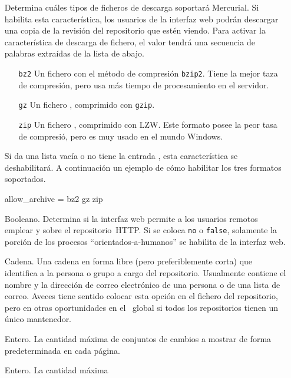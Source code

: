 \begin{itemize}
\item[\rcitem{web}{allow\_archive}] Determina cuáles tipos de ficheros
  de descarga soportará Mercurial.  Si habilita esta característica,
  los usuarios de la interfaz web podrán descargar una copia de la
  revisión del repositorio que estén viendo. Para activar la
  característica de descarga de fichero, el valor tendrá una secuencia
  de palabras extraídas de la lista de abajo.
  \begin{itemize}
  \item[\texttt{bz2}] Un fichero  con el método de
    compresión \texttt{bzip2}.  Tiene la mejor taza de compresión,
    pero usa más tiempo de procesamiento en el servidor.
  \item[\texttt{gz}] Un fichero , comprimido con
    \texttt{gzip}.
  \item[\texttt{zip}] Un fichero , comprimido con LZW.
    Este formato posee la peor tasa de compresió, pero es muy usado en
    el mundo Windows.
  \end{itemize}
  Si da una lista vacía o no tiene la entrada
  , esta característica se deshabilitará.
  A continuación un ejemplo de cómo habilitar los tres formatos soportados.
  \begin{codesample4}
    [web]
    allow_archive = bz2 gz zip
  \end{codesample4}
\item[\rcitem{web}{allowpull}] Booleano.  Determina si la interfaz web
  permite a los usuarios remotos emplear  y 
  sobre el repositorio~HTTP.  Si se coloca \texttt{no} o
  \texttt{false}, solamente la porción de los procesos
  ``orientados-a-humanos'' se habilita de la interfaz web.
\item[\rcitem{web}{contact}] Cadena.  Una cadena en forma libre (pero
  preferiblemente corta) que identifica a la persona o grupo a cargo
  del repositorio.  Usualmente contiene el nombre y la dirección de
  correo electrónico de una persona o de una lista de correo.  Aveces
  tiene sentido colocar esta opción en el fichero 
  del repositorio, pero en otras oportunidades en el \hgrc\ global si
  todos los repositorios tienen un único mantenedor.
\item[\rcitem{web}{maxchanges}] Entero.  La cantidad máxima de
  conjuntos de cambios a mostrar de forma predeterminada en cada página.
\item[\rcitem{web}{maxfiles}] Entero.  La cantidad máxima

\end{itemize}
